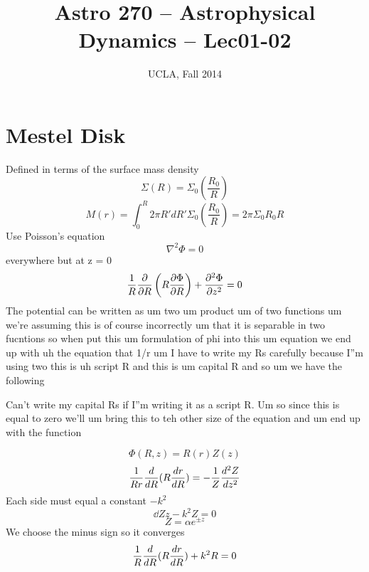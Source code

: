 


\title{Astro 270 -- Astrophysical Dynamics -- Lec01-02}
\author{UCLA, Fall 2014}


\setlength{\unitlength}{1mm}
\maketitle

\section{Mestel Disk}
Defined in terms of the surface mass density
\begin{equation}
\Sigma(R) = \Sigma_0 \left(\frac{R_0}{R}\right)
\end{equation}
\begin{equation}
M(r) = \int_0^R 2\pi R' dR' \Sigma_0 \left(\frac{R_0}{R}\right) = 2\pi \Sigma_0 R_0R
\end{equation}
Use Poisson's equation
\begin{equation} 
\nabla^2 \Phi = 0
\end{equation}
everywhere but at z = 0
\begin{equation}
\frac{1}{R} \frac{\partial }{\partial R} \left(R \frac{\partial \Phi}{\partial R}\right) + \frac{\partial^2 \Phi}{\partial z^2} = 0
\end{equation}
The potential can be written as um two um product um of two functions um we're assuming this is of course incorrectly um that it is separable in two fucntions so when put this um formulation of phi into this um equation we end up with uh the equation that 1/r um I have to write my Rs carefully because I''m using two this is uh script R and this is um capital R and so um we have the following 

Can't write my capital Rs if I''m writing it as a script R. Um so since this is equal to zero we'll um bring this to teh other size of the equation and um end up with the function 

\begin{equation}
\Phi (R,z) = R(r) Z(z)
\end{equation}
\begin{equation}
\frac{1}{Rr} \frac{d }{d R} (R \frac{d r}{d R}) = -\frac{1}{Z} \frac{d^2 Z}{d z^2}
\end{equation}
Each side must equal a constant $-k^2$
\begin{equation}
\dd{Z}{z} - k^2Z = 0
\end{equation}
\begin{equation}
Z = \alpha e^{\pm z}
\end{equation}
We choose the minus sign so it converges
\begin{equation}
\frac{1}{R} \frac{d }{d R} (R \frac{d r}{d R}) + k^2R=0
\end{equation}

